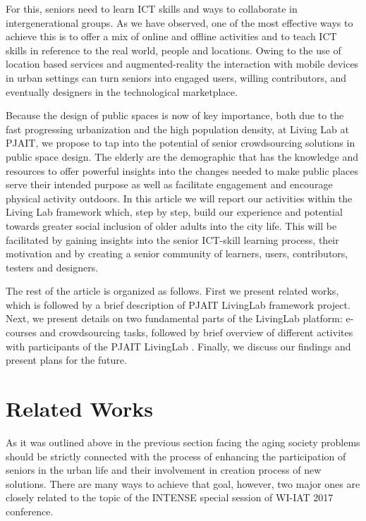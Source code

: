 \documentclass[sigconf]{acmart}
\begin{document}
For this, seniors need to learn ICT skills and ways to collaborate in intergenerational groups. As we have observed, one of the most effective ways to achieve this is to offer a mix of online and offline activities and to teach ICT skills in reference to the real world, people and locations. Owing to the use of location based services and augmented-reality the interaction with mobile devices in urban settings can turn seniors into engaged users,  willing contributors, and eventually designers in the technological marketplace.

Because the design of public spaces is now of key importance, both due to the fast progressing urbanization and the high population density, at Living Lab at PJAIT, we propose to tap into the potential of senior crowdsourcing solutions in public space design. The elderly are the demographic that has the knowledge and resources to offer powerful insights into the changes needed to make public places serve their intended purpose as well as facilitate engagement and encourage physical activity outdoors. In this article we will report our activities within the Living Lab framework which, step by step, build our experience and potential towards greater social inclusion of older adults into the city life. This will be facilitated by gaining insights into the senior ICT-skill learning process, their motivation and by creating a senior community of learners, users, contributors, testers and designers.

The rest of the article is organized as follows. First we present related works, which is followed by a brief description of PJAIT LivingLab  framework project. Next, we present details on two fundamental parts of the LivingLab platform: e-courses and crowdsourcing tasks, followed by brief overview of different activites with participants of the PJAIT LivingLab . Finally, we discuss our findings and present plans for the future.

\section{Related Works}
As it was outlined above in the previous section facing the aging society problems should be strictly connected with the process of enhancing the participation of seniors in the urban life and their involvement in creation process of new solutions. There are many ways to achieve that goal, however, two major ones are closely related to the topic of the INTENSE special session of WI-IAT 2017 conference. 
\end{document}
